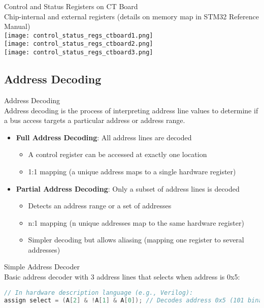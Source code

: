 \begin{theorem}{Control and Status Registers on CT Board}\\
    Chip-internal and external registers (details on memory map in STM32 Reference Manual)\\
    \texttt{[image: control\_status\_regs\_ctboard1.png]}\\
    \texttt{[image: control\_status\_regs\_ctboard2.png]}\\
    \texttt{[image: control\_status\_regs\_ctboard3.png]}
\end{theorem}


\subsection{Address Decoding}

\begin{definition}{Address Decoding}\\
Address decoding is the process of interpreting address line values to determine if a bus access targets a particular address or address range.
\begin{itemize}
    \item \textbf{Full Address Decoding}: All address lines are decoded
    \begin{itemize}
        \item A control register can be accessed at exactly one location
        \item 1:1 mapping (a unique address maps to a single hardware register)
    \end{itemize}
    \item \textbf{Partial Address Decoding}: Only a subset of address lines is decoded
    \begin{itemize}
        \item Detects an address range or a set of addresses
        \item n:1 mapping (n unique addresses map to the same hardware register)
        \item Simpler decoding but allows aliasing (mapping one register to several addresses)
    \end{itemize}
\end{itemize}
\end{definition}

\begin{examplecode}{Simple Address Decoder}\\
Basic address decoder with 3 address lines that selects when address is 0x5:
\begin{lstlisting}[language=C, style=basesmol]
// In hardware description language (e.g., Verilog):
assign select = (A[2] & !A[1] & A[0]); // Decodes address 0x5 (101 binary)
\end{lstlisting}
\end{examplecode}

